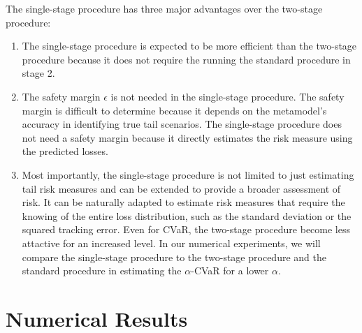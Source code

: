 The single-stage procedure has three major advantages over the two-stage procedure:
\begin{enumerate}
    \item The single-stage procedure is expected to be more efficient than the two-stage procedure because it does not require the running the standard procedure in stage 2.
    \item The safety margin $\epsilon$ is not needed in the single-stage procedure.
    The safety margin is difficult to determine because it depends on the metamodel's accuracy in identifying true tail scenarios.
    The single-stage procedure does not need a safety margin because it directly estimates the risk measure using the predicted losses.
    \item Most importantly, the single-stage procedure is not limited to just estimating tail risk measures and can be extended to provide a broader assessment of risk. 
    It can be naturally adapted to estimate risk measures that require the knowing of the entire loss distribution, such as the standard deviation or the squared tracking error.
    Even for CVaR, the two-stage procedure become less attactive for an increased level.
    In our numerical experiments, we will compare the single-stage procedure to the two-stage procedure and the standard procedure in estimating the $\alpha$-CVaR for a lower $\alpha$.
\end{enumerate}

\section{Numerical Results} \label{sec2:numerical}

